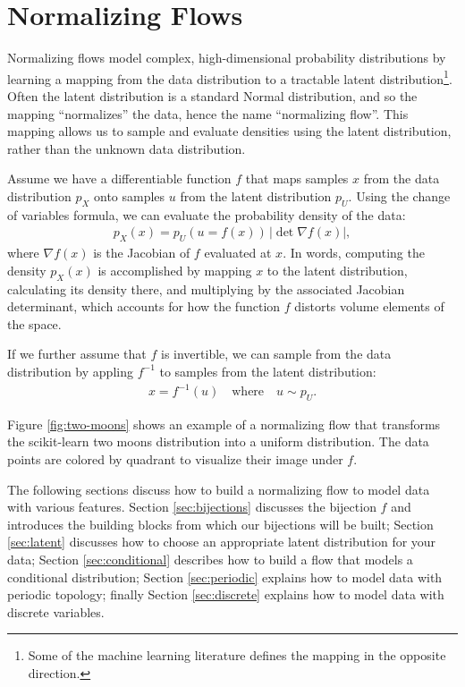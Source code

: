 \documentclass[twocolumn,twocolappendix]{aastex631}
\newcommand{\px}{p^{}_{X}}
\newcommand{\pu}{p^{}_{U}}
\begin{document}
\section{Normalizing Flows}
\label{sec:nf}

Normalizing flows model complex, high-dimensional probability distributions by learning a mapping from the data distribution to a tractable latent distribution\footnote{Some of the machine learning literature defines the mapping in the opposite direction.}.
Often the latent distribution is a standard Normal distribution, and so the mapping ``normalizes'' the data, hence the name ``normalizing flow''.
This mapping allows us to sample and evaluate densities using the latent distribution, rather than the unknown data distribution.

Assume we have a differentiable function $f$ that maps samples $x$ from the data distribution $\px$ onto samples $u$ from the latent distribution $\pu$.
Using the change of variables formula, we can evaluate the probability density of the data:
\begin{align}
    \px(x) = \pu(u=f(x)) \, |\det \nabla f(x)|,
    \label{eq:px}
\end{align}
where $\nabla f(x)$ is the Jacobian of $f$ evaluated at $x$.
In words, computing the density $\px(x)$ is accomplished by mapping $x$ to the latent distribution, calculating its density there, and multiplying by the associated Jacobian determinant, which accounts for how the function $f$ distorts volume elements of the space.

If we further assume that $f$ is invertible, we can sample from the data distribution by appling $f^{-1}$ to samples from the latent distribution:
\begin{align}
    x = f^{-1}(u) \quad \text{where} \quad u \sim \pu.
\end{align}

Figure \ref{fig:two-moons} shows an example of a normalizing flow that transforms the scikit-learn \citep{sklearn} two moons distribution into a uniform distribution.
The data points are colored by quadrant to visualize their image under $f$.

The following sections discuss how to build a normalizing flow to model data with various features.
Section \ref{sec:bijections} discusses the bijection $f$ and introduces the building blocks from which our bijections will be built;
Section \ref{sec:latent} discusses how to choose an appropriate latent distribution for your data;
Section \ref{sec:conditional} describes how to build a flow that models a conditional distribution;
Section \ref{sec:periodic} explains how to model data with periodic topology;
finally Section \ref{sec:discrete} explains how to model data with discrete variables.
\end{document}
